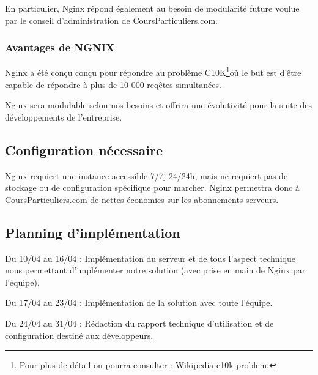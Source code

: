 \documentclass{article}
\begin{document}
En particulier, Nginx répond également au besoin de modularité future voulue par le conseil d'administration de CoursParticuliers.com.

 \subsubsection{Avantages de NGNIX}

Nginx a été conçu conçu pour répondre au problème C10K\footnote{Pour plus de détail on pourra consulter :  \href{https://en.wikipedia.org/wiki/C10k_problem#:~:text=The\%20C10k\%20problem\%20is\%20the,concurrently\%20handling\%20ten\%20thousand\%20connections}{Wikipedia c10k problem}.}où le but est d'être capable de répondre à plus de 10 000 reqêtes simultanées. 

Nginx sera modulable selon nos besoins et offrira une évolutivité pour la suite des développements de l'entreprise.


\subsection{Configuration nécessaire}

Nginx requiert une instance accessible 7/7j 24/24h, mais ne requiert pas de stockage ou de configuration spécifique pour marcher. 
Nginx permettra donc à CoursParticuliers.com de nettes économies sur les abonnements serveurs.

\subsection{Planning d'implémentation}


Du 10/04 au 16/04 : Implémentation du serveur et de tous l’aspect technique nous permettant d’implémenter notre solution (avec prise en main de Nginx par l'équipe). 

Du 17/04 au 23/04 : Implémentation de la solution avec toute l’équipe. 

Du 24/04 au 31/04 : Rédaction du rapport technique d'utilisation et de configuration destiné aux développeurs. 
\end{document}
